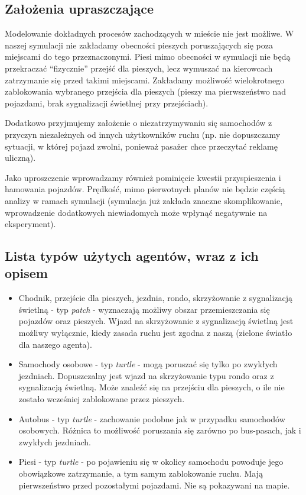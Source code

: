 \documentclass{article}
\begin{document}
\subsection{Założenia upraszczające}
\label{subsection:uproszczenia}
Modelowanie dokładnych procesów zachodzących w mieście nie jest możliwe. W naszej symulacji nie zakładamy obecności pieszych poruszających się poza miejscami do tego przeznaczonymi. Piesi mimo obecności w symulacji nie będą przekraczać ``fizycznie'' przejść dla pieszych, lecz wymuszać na kierowcach zatrzymanie się przed takimi miejscami. Zakładamy możliwość wielokrotnego zablokowania wybranego przejścia dla pieszych (pieszy ma pierwszeństwo nad pojazdami, brak sygnalizacji świetlnej przy przejściach).

Dodatkowo przyjmujemy założenie o niezatrzymywaniu się samochodów z przyczyn niezależnych od innych użytkowników ruchu (np. nie dopuszczamy sytuacji, w której pojazd zwolni, ponieważ pasażer chce przeczytać reklamę uliczną).

Jako uproszczenie wprowadzamy również pominięcie kwestii przyspieszenia i hamowania pojazdów. Prędkość, mimo pierwotnych planów nie będzie częścią analizy w ramach symulacji (symulacja już zakłada znaczne skomplikowanie, wprowadzenie dodatkowych niewiadomych może wpłynąć negatywnie na eksperyment).

\subsection{Lista typów użytych agentów, wraz z ich opisem}
\label{subsection:agenty}
\begin{itemize}
    \item Chodnik, przejście dla pieszych, jezdnia, rondo, skrzyżowanie z sygnalizacją świetlną - typ \textit{patch} - wyznaczają możliwy obszar przemieszczania się pojazdów oraz pieszych. Wjazd na skrzyżowanie z sygnalizacją świetlną jest możliwy wyłącznie, kiedy zasada ruchu jest zgodna z naszą (zielone światło dla naszego agenta).
    \item Samochody osobowe - typ \textit{turtle} - mogą poruszać się tylko po zwykłych jezdniach. Dopuszczalny jest wjazd na skrzyżowanie typu rondo oraz z sygnalizacją świetlną. Może znaleźć się na przejściu dla pieszych, o ile nie zostało wcześniej zablokowane przez pieszych.
    \item Autobus - typ \textit{turtle} - zachowanie podobne jak w przypadku samochodów osobowych. Różnica to możliwość poruszania się zarówno po bus-pasach, jak i zwykłych jezdniach.
    \item Piesi - typ \textit{turtle} - po pojawieniu się w okolicy samochodu powoduje jego obowiązkowe zatrzymanie, a tym samym zablokowanie ruchu. Mają pierwszeństwo przed pozostałymi pojazdami. Nie są pokazywani na mapie.
\end{itemize}
\end{document}
